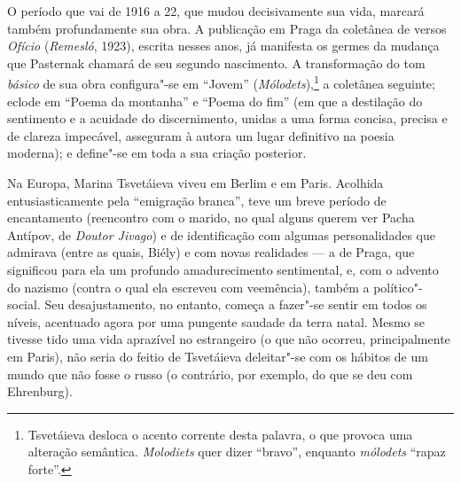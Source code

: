O período que vai de 1916 a 22, que mudou decisivamente sua
vida, marcará também profundamente sua obra. A publicação em Praga da
coletânea de versos \emph{Ofício} (\emph{Remesló}, 1923), escrita nesses anos, já
manifesta os germes da mudança que Pasternak chamará de seu segundo
nascimento. A transformação do tom \emph{básico} de sua obra
configura"-se em ``Jovem'' (\emph{Mólodets}),\footnote{Tsvetáieva
desloca o acento corrente desta palavra, o que provoca uma
alteração semântica. \emph{Molodiets} quer dizer ``bravo'',
enquanto \emph{mólodets} ``rapaz forte''.} a coletânea seguinte;
eclode em ``Poema da montanha'' e ``Poema do fim'' (em que a
destilação do sentimento e a acuidade do discernimento, unidas
a uma forma concisa, precisa e de clareza impecável, asseguram
à autora um lugar definitivo na poesia moderna); e define"-se
em toda a sua criação posterior.

Na Europa, Marina Tsvetáieva viveu em Berlim e em Paris. Acolhida
entusiasticamente pela ``emigração branca'', teve um breve período
de encantamento (reencontro com o marido, no qual alguns querem
ver Pacha Antípov, de \emph{Doutor Jivago}) e de identificação
com algumas personalidades que admirava (entre as quais, Biély)
e com novas realidades --- a de Praga, que significou para ela
um profundo amadurecimento sentimental, e, com o advento do
nazismo (contra o qual ela escreveu com veemência), também a
político"-social. Seu desajustamento, no entanto, começa a
fazer"-se sentir em todos os níveis, acentuado agora por uma
pungente saudade da terra natal. Mesmo se tivesse tido uma
vida aprazível no estrangeiro (o que não ocorreu, principalmente
em Paris), não seria do feitio de Tsvetáieva deleitar"-se com os
hábitos de um mundo que não fosse o russo (o contrário, por
exemplo, do que se deu com Ehrenburg).

